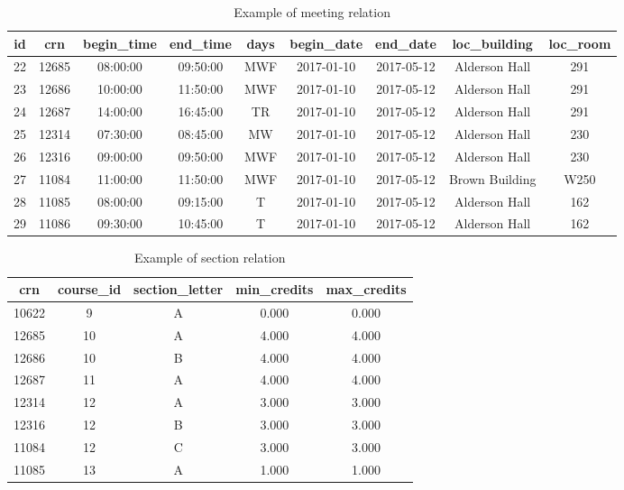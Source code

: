 \documentclass[12pt,letterpaper,titlepage]{article}
\begin{document}
\begin{table}[H]
\centering
\begin{tabular}{|c|c|c|c|c|c|c|c|c|}
\hline
id & crn & begin\_time & end\_time & days & begin\_date & end\_date & loc\_building & loc\_room \\ \hline
22 & 12685 & 08:00:00 & 09:50:00 & MWF & 2017-01-10 & 2017-05-12 & Alderson Hall & 291 \\ \hline
23 & 12686 & 10:00:00 & 11:50:00 & MWF & 2017-01-10 & 2017-05-12 & Alderson Hall & 291 \\ \hline
24 & 12687 & 14:00:00 & 16:45:00 & TR & 2017-01-10 & 2017-05-12 & Alderson Hall & 291 \\ \hline
25 & 12314 & 07:30:00 & 08:45:00 & MW & 2017-01-10 & 2017-05-12 & Alderson Hall & 230 \\ \hline
26 & 12316 & 09:00:00 & 09:50:00 & MWF & 2017-01-10 & 2017-05-12 & Alderson Hall & 230 \\ \hline
27 & 11084 & 11:00:00 & 11:50:00 & MWF & 2017-01-10 & 2017-05-12 & Brown Building & W250 \\ \hline
28 & 11085 & 08:00:00 & 09:15:00 & T & 2017-01-10 & 2017-05-12 & Alderson Hall & 162 \\ \hline
29 & 11086 & 09:30:00 & 10:45:00 & T & 2017-01-10 & 2017-05-12 & Alderson Hall & 162 \\ \hline
\end{tabular}
\caption{\label{tbl:meeting} Example of meeting relation}
\end{table}

\begin{table}[H]
\centering
\begin{tabular}{|c|c|c|c|c|}
\hline
crn & course\_id & section\_letter & min\_credits & max\_credits \\ \hline
10622 & 9 & A & 0.000 & 0.000 \\ \hline
12685 & 10 & A & 4.000 & 4.000 \\ \hline
12686 & 10 & B & 4.000 & 4.000 \\ \hline
12687 & 11 & A & 4.000 & 4.000 \\ \hline
12314 & 12 & A & 3.000 & 3.000 \\ \hline
12316 & 12 & B & 3.000 & 3.000 \\ \hline
11084 & 12 & C & 3.000 & 3.000 \\ \hline
11085 & 13 & A & 1.000 & 1.000 \\ \hline
\end{tabular}
\caption{\label{tbl:section} Example of section relation}
\end{table}
\end{document}

